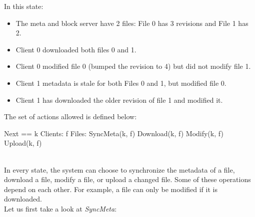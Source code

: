 In this state:
\begin{itemize}
    \item The meta and block server have 2 files: File 0 has 3 revisions and File 1 has 2.
    \item Client 0 downloaded both files 0 and 1.
    \item Client 0 modified file 0 (bumped the revision to 4) but did not modify file 1.
    \item Client 1 metadata is stale for both Files 0 and 1, but modified file 0.
    \item Client 1 has downloaded the older revision of file 1 and modified it.
\end{itemize}

The set of actions allowed is defined below:\\
\begin{tla}
Next ==
    \/ \E k \in Clients: 
        \E f \in Files: 
            \/ SyncMeta(k, f)
            \/ Download(k, f)
            \/ Modify(k, f)
            \/ Upload(k, f)
\end{tla}
\begin{tlatex}
%
%
%
%
%
%
%
\end{tlatex}
\\

In every state, the system can choose to synchronize the metadata of a file, download a
file, modify a file, or upload a changed file. Some of these operations depend
on each other. For example, a file can only be modified if it is downloaded.\\ 

Let us first take a look at \textit{SyncMeta}:\\

